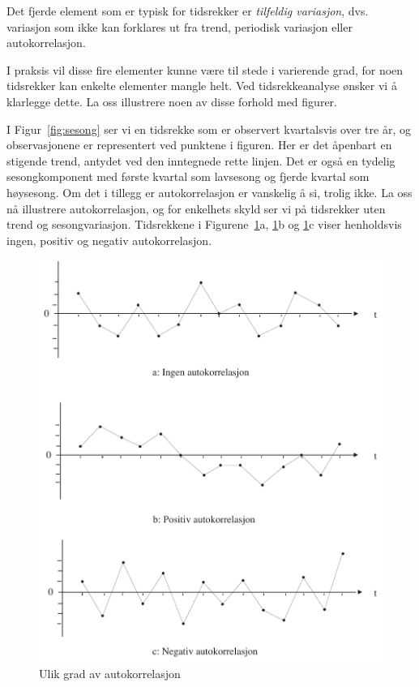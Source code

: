 Det fjerde element som er typisk for tidsrekker er {\em tilfeldig variasjon},
dvs. variasjon som ikke kan forklares ut fra trend, periodisk variasjon
eller autokorrelasjon.

I praksis vil disse fire elementer kunne være til stede i varierende
grad, for noen tidsrekker kan enkelte elementer mangle helt.  Ved
tidsrekkeanalyse ønsker vi å klarlegge dette.  La oss illustrere noen
av disse forhold med figurer.

I Figur~\ref{fig:sesong} ser vi en tidsrekke som er observert kvartalsvis over tre år,
og observasjonene er representert ved punktene i figuren.  Her er det 
åpenbart en stigende trend, antydet ved den inntegnede rette linjen. Det er 
også en tydelig sesongkomponent med første kvartal som lavsesong og
fjerde kvartal som høysesong.  Om det i tillegg er autokorrelasjon er
vanskelig å si, trolig ikke.  La oss nå illustrere autokorrelasjon,
og for enkelhets skyld ser vi på tidsrekker uten trend og sesongvariasjon.
Tidsrekkene i Figurene~\ref{fig:autocor}a, \ref{fig:autocor}b og 
\ref{fig:autocor}c viser henholdsvis ingen, positiv og negativ
autokorrelasjon.

\begin{figure}[H]
   \centering
   \includegraphics[scale=0.7]{figurer/fig13_2.pdf} 
   \caption{Ulik grad av autokorrelasjon}
	\label{fig:autocor}
\end{figure}

